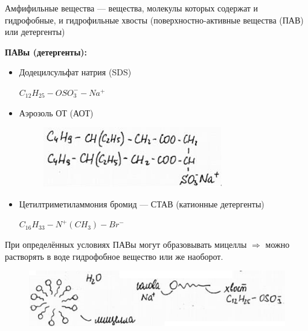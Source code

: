 \begin{lecture}
	\begin{lecSection}
	\begin{flushleft}
		\begin{definition}
		Амфифильные вещества --- вещества, молекулы которых содержат и гидрофобные, и гидрофильные хвосты (поверхностно-активные вещества (ПАВ) или детергенты)
		\end{definition}
	\par \textbf{ПАВы (детергенты):}
		\begin{itemize}
			\item Додецилсульфат натрия (SDS)
				\par $C_{12}H_{25}-OSO_3^--Na^+$
			\item Аэрозоль ОТ (АОТ)
				\begin{figure}[H]
				\begin{minipage}[h]{0.5\linewidth}
					\centering\includegraphics[width=\linewidth]{lecture_07/pic5}
				\end{minipage}
				\hfill
				\end{figure}
			\item Цетилтриметиламмония бромид — СТАВ (катионные детергенты)
				\par $C_{16}H_{33}-N^+ (CH_3)-Br^-$
		\end{itemize}
		\par При определённых условиях ПАВы могут образовывать мицеллы $\Rightarrow$ можно растворять в воде гидрофобное вещество или же наоборот.
			\begin{figure}[H]
			\begin{minipage}[h]{0.7\linewidth}
				\centering\includegraphics[width=\linewidth]{lecture_07/pic6}
			\end{minipage}
			\hfill
			\end{figure}
	

\end{flushleft}
\end{lecSection}
\end{lecture}
